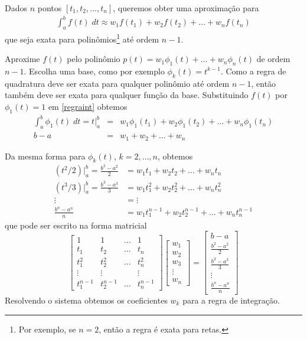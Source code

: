 Dados $n$ pontos $[t_1,t_2,\ldots ,t_n]$, queremos obter uma aproximação para
\begin{align}\label{regraint}
  \int _a^b f(t) \;dt \approx w_1f(t_1)+w_2f(t_2)+\ldots +w_nf(t_n)
\end{align}
que seja exata para polinômios\footnote{Por exemplo, se $n=2$, então a regra é exata para retas.} até ordem  $n-1$.

Aproxime $f(t)$ pelo polinômio $p(t)=w_1\phi_1(t)+\ldots +w_n \phi_n(t)$ de ordem $n-1$. Escolha uma base, como por exemplo $\phi _k(t)=t^{k-1}$. Como a regra de quadratura deve ser exata para qualquer polinômio até ordem $n-1$, então também deve ser exata para qualquer função da base. Substituindo $f(t)$ por $\phi _1(t)=1$ em \eqref{regraint} obtemos
\begin{eqnarray}
\int _a^b \phi_1(t) \; dt = t|_a^b &=&  w_1\phi _1(t_1)+w_2\phi _1(t_2)+\ldots +w_n\phi_1(t_n) \\
                              b-a  &=&  w_1+w_2+\ldots +w_n
\end{eqnarray}

Da mesma forma para $\phi_k(t)$, $k=2,\ldots,n$, obtemos
\begin{align}
   (t^2/2)|_a^b = \frac{b^2-a^2}{2} &=  w_1t_1  +w_2t_2  +\ldots +w_nt_n   \\
   (t^3/3)|_a^b = \frac{b^3-a^3}{3} &=  w_1t_1^2+w_2t_2^2+\ldots +w_nt_n^2 \\
                    \vdots          &=  \vdots    \\
 \frac{b^{n}-a^{n}}{n}              &=  w_1t_1^{n-1}+w_2t_2^{n-1}+\ldots +w_nt_n^{n-1}
\end{align}
que pode ser escrito na forma matricial
\begin{equation}
\begin{bmatrix}
    1     &  1    & \ldots   &  1 \\
    t_1   &  t_2   & \ldots   & t_n \\
    t_1^2 &  t_2^2  & \ldots   & t_n^2 \\
    \vdots    &  \vdots     &    & \vdots   \\
    t_1^{n-1} & t_2^{n-1} & \ldots   & t_n^{n-1}
\end{bmatrix}
\begin{bmatrix}  w_1 \\ w_2\\ w_3  \\ \vdots   \\ w_n     \end{bmatrix}
=
\begin{bmatrix}  b-a  \\ \frac{b^2-a^2}{2} \\ \frac{b^3-a^3}{3} \\ \vdots  \\ \frac{b^{n}-a^{n}}{n}  \end{bmatrix}
\end{equation}
Resolvendo o sistema obtemos os coeficientes $w_k$ para a regra de integração.

